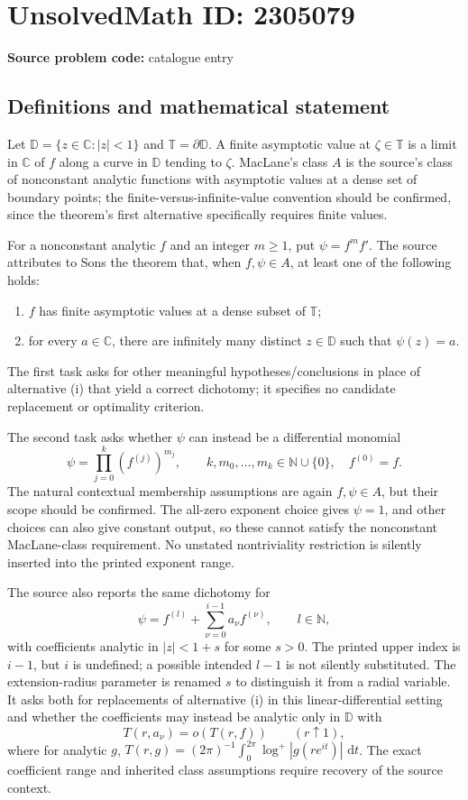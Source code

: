 \documentclass[11pt]{article}
\newcommand{\N}{\mathbb{N}}
\newcommand{\C}{\mathbb{C}}
\newcommand{\dd}{\,\mathrm{d}}
\begin{document}
\section*{UnsolvedMath ID: 2305079}
\textbf{Source problem code:} catalogue entry
\subsection{Definitions and mathematical statement}
Let $\mathbb D=\{z\in\C:|z|<1\}$ and $\mathbb T=\partial\mathbb D$. A finite asymptotic value at $\zeta\in\mathbb T$ is a limit in $\C$ of $f$ along a curve in $\mathbb D$ tending to $\zeta$. MacLane's class $A$ is the source's class of nonconstant analytic functions with asymptotic values at a dense set of boundary points; the finite-versus-infinite-value convention should be confirmed, since the theorem's first alternative specifically requires finite values.

For a nonconstant analytic $f$ and an integer $m\geq1$, put $\psi=f^mf'$. The source attributes to Sons the theorem that, when $f,\psi\in A$, at least one of the following holds:
\begin{enumerate}
\item $f$ has finite asymptotic values at a dense subset of $\mathbb T$;
\item for every $a\in\C$, there are infinitely many distinct $z\in\mathbb D$ such that $\psi(z)=a$.
\end{enumerate}
The first task asks for other meaningful hypotheses/conclusions in place of alternative (i) that yield a correct dichotomy; it specifies no candidate replacement or optimality criterion.

The second task asks whether $\psi$ can instead be a differential monomial
\[
 \psi=\prod_{j=0}^{k}(f^{(j)})^{m_j},\qquad
 k,m_0,\ldots,m_k\in\N\cup\{0\},\quad f^{(0)}=f.
\]
The natural contextual membership assumptions are again $f,\psi\in A$, but their scope should be confirmed. The all-zero exponent choice gives $\psi=1$, and other choices can also give constant output, so these cannot satisfy the nonconstant MacLane-class requirement. No unstated nontriviality restriction is silently inserted into the printed exponent range.

The source also reports the same dichotomy for
\[
 \psi=f^{(l)}+\sum_{\nu=0}^{i-1}a_\nu f^{(\nu)},\qquad l\in\N,
\]
with coefficients analytic in $|z|<1+s$ for some $s>0$. The printed upper index is $i-1$, but $i$ is undefined; a possible intended $l-1$ is not silently substituted. The extension-radius parameter is renamed $s$ to distinguish it from a radial variable. It asks both for replacements of alternative (i) in this linear-differential setting and whether the coefficients may instead be analytic only in $\mathbb D$ with
\[
 T(r,a_\nu)=o(T(r,f))\qquad(r\uparrow1),
\]
where for analytic $g$, $T(r,g)=(2\pi)^{-1}\int_0^{2\pi}\log^+|g(re^{it})|\,\dd t$. The exact coefficient range and inherited class assumptions require recovery of the source context.
\end{document}

